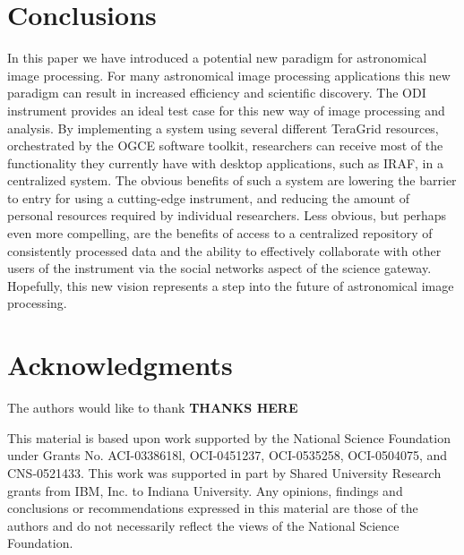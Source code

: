 \documentclass[10pt,conference]{IEEEtran}
\begin{document}
\section{Conclusions}\label{sec:conclusions}

In this paper we have introduced a potential new paradigm for astronomical image processing. For many astronomical image processing applications this new paradigm can result in increased efficiency and scientific discovery. The ODI instrument provides an ideal test case for this new way of image processing and analysis. By implementing a system using several different TeraGrid resources, orchestrated by the OGCE software toolkit, researchers can receive most of the functionality they currently have with desktop applications, such as IRAF, in a centralized system. The obvious benefits of such a system are lowering the barrier to entry for using a cutting-edge instrument, and reducing the amount of personal resources required by individual researchers. Less obvious, but perhaps even more compelling, are the benefits of access to a centralized repository of consistently processed data and the ability to effectively collaborate with other users of the instrument via the social networks aspect of the science gateway. Hopefully, this new vision represents a step into the future of astronomical image processing. 

\section*{Acknowledgments}

The authors would like to thank {\bf THANKS HERE}

This material is based upon work supported by the National Science Foundation under Grants No. ACI-0338618l, OCI-0451237, OCI-0535258, OCI-0504075, and CNS-0521433. This work was supported in part by Shared University Research grants from IBM, Inc. to Indiana University. Any opinions, findings and conclusions or recommendations expressed in this material are those of the authors and do not necessarily reflect the views of the National Science Foundation. 





\end{document}
